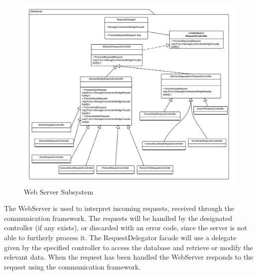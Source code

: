 \begin{figure}[H]
\includegraphics[width=\linewidth]{img/SDD/WebserverSubsystem.png}
\caption{Web Server Subsystem}
\label{fig:WebServer}
\end{figure}
The WebServer is used to interpret incoming requests, received through the communication framework. The requests will be handled by the designated controller (if any exists), or discarded with an error code, since the server is not able to furtherly process it.
The RequestDelegator facade will use a delegate given by the specified controller to access the database and retrieve or modify the relevant data. When the request has been handled the WebServer responds to the request using the communication framework.

